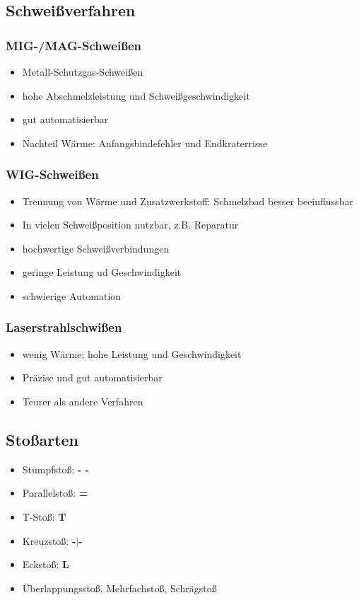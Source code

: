 \documentclass[a4paper,parskip=half*,DIV=7,fontsize=11pt]{scrartcl}
\begin{document}
\subsection{Schweißverfahren}
\subsubsection{MIG-/MAG-Schweißen}
\begin{itemize}
	\item Metall-Schutzgas-Schweißen
	\item hohe Abschmelzleistung und Schweißgeschwindigkeit
	\item gut automatisierbar
	\item Nachteil Wärme: Anfangsbindefehler und Endkraterrisse
\end{itemize}
	
\subsubsection{WIG-Schweißen}
\begin{itemize}
	\item Trennung von Wärme und Zusatzwerkstoff: Schmelzbad besser beeinflussbar
	\item In vielen Schweißposition nutzbar, z.B. Reparatur
	\item hochwertige Schweißverbindungen
	\item geringe Leistung ud Geschwindigkeit
	\item schwierige Automation
\end{itemize}

\subsubsection{Laserstrahlschwißen}
\begin{itemize}
	\item wenig Wärme; hohe Leistung und Geschwindigkeit
	\item Präzise und gut automatisierbar
	\item Teurer als andere Verfahren
\end{itemize}

\subsection{Stoßarten}
\begin{itemize}
	\item Stumpfstoß: \textbf{- -}
	\item Parallelstoß: \textbf{=}
	\item T-Stoß: \textbf{T}
	\item Kreuzstoß: \textbf{-$\mid$-}
	\item Eckstoß: \textbf{L}
	\item Überlappungsstoß, Mehrfachstoß, Schrägstoß
\end{itemize}
	
\end{document}
